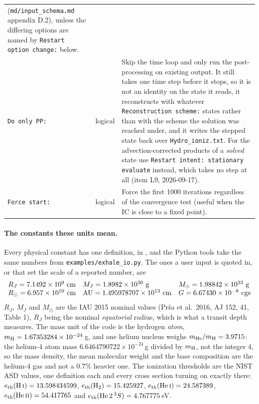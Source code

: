 \documentclass[english,a4paper]{my_memo}
\begin{document}
\begin{longtable}{@{}p{}p{}p{}@{}}
  (\texttt{md/input\_schema.md} appendix D.2), unless the differing options
  are named by \texttt{Restart option change:} below. \\
\texttt{Do only PP:} & logical & Skip the time loop and only run the
  post-processing on existing output. It still takes one time step before it
  stops, so it is not an identity on the state it reads, it reconstructs with
  whatever \texttt{Reconstruction scheme:} states rather than with the scheme
  the solution was reached under, and it writes the stepped state back over
  \texttt{Hydro\_ioniz.txt}. For the advection-corrected products of a
  \emph{solved} state use \texttt{Restart intent: stationary evaluate}
  instead, which takes no step at all (item L9, 2026-09-17). \\
\texttt{Force start:} & logical & Force the first 1000 iterations regardless of
  the convergence test (useful when the IC is close to a fixed point). \\
\end{longtable}

\paragraph{The constants these units mean.} Every physical constant has one
definition, in , and the Python tools
take the same numbers from \texttt{examples/exhale\_io.py}. The ones a user
input is quoted in, or that set the scale of a reported number, are
\[
\begin{array}{lll}
  R_J    = 7.1492\times10^{9}\ {\rm cm} & M_J = 1.8982\times10^{30}\ {\rm g}
         & M_\odot = 1.98842\times10^{33}\ {\rm g} \\
  R_\odot = 6.957\times10^{10}\ {\rm cm} & {\rm AU} = 1.495978707\times10^{13}\ {\rm cm}
         & G = 6.67430\times10^{-8}\ {\rm cgs}
\end{array}
\]
$R_J$, $M_J$ and $M_\odot$ are the IAU 2015 nominal values (Pr\v{s}a et al.\
2016, AJ 152, 41, Table 1), $R_J$ being the nominal \emph{equatorial} radius,
which is what a transit depth measures. The mass unit of the code is the
hydrogen \emph{atom}, $m_{\rm H}=1.67353284\times10^{-24}$\,g, and one helium
nucleus weighs $m_{\rm He}/m_{\rm H}=3.9715$: the helium-4 atom mass
$6.6464790722\times10^{-24}$\,g divided by $m_{\rm H}$, not the integer 4, so
the mass density, the mean molecular weight and the base composition are the
helium-4 gas and not a 0.7\% heavier one. The ionization thresholds are the
NIST ASD values, one definition each and every cross section turning on exactly
there:
$e_{\rm th}({\rm H\,\textsc{i}})=13.598434599$,
$e_{\rm th}({\rm H_2})=15.425927$,
$e_{\rm th}({\rm He\,\textsc{i}})=24.587389$,
$e_{\rm th}({\rm He\,\textsc{ii}})=54.417765$ and
$e_{\rm th}({\rm He}\,2\,^3S)=4.767775$\,eV.
\end{document}
